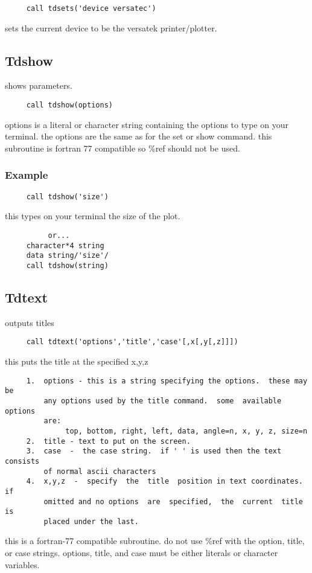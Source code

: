 \begin{verbatim}
     call tdsets('device versatec') 
\end{verbatim}
sets the current device to be the versatek printer/plotter.  
\subsection{Tdshow}
shows parameters.  
\begin{verbatim}
     call tdshow(options) 
\end{verbatim}

options  is  a literal or character string containing the options to type
on your terminal.  the options are the  same  as  for  the  set  or  show
command.   this subroutine is fortran 77 compatible so \%ref should not be
used.  
\subsubsection{Example}
\begin{verbatim}
     call tdshow('size') 
\end{verbatim}
this types on your terminal the size of the plot.  
\begin{verbatim}
          or...  
     character*4 string 
     data string/'size'/ 
     call tdshow(string) 
\end{verbatim}
\subsection{Tdtext}
outputs titles 
\begin{verbatim}
     call tdtext('options','title','case'[,x[,y[,z]]]) 
\end{verbatim}
this puts the title at the specified x,y,z 

\begin{verbatim}
     1.  options - this is a string specifying the options.  these may be
         any options used by the title command.  some  available  options
         are:  
              top, bottom, right, left, data, angle=n, x, y, z, size=n 
     2.  title - text to put on the screen.  
     3.  case  -  the case string.  if ' ' is used then the text consists
         of normal ascii characters 
     4.  x,y,z  -  specify  the  title  position in text coordinates.  if
         omitted and no options  are  specified,  the  current  title  is
         placed under the last.  
\end{verbatim}

this  is  a  fortran-77  compatible subroutine.  do not use \%ref with the
option, title, or case strings.  options, title, and case must be  either
literals or character variables.  
